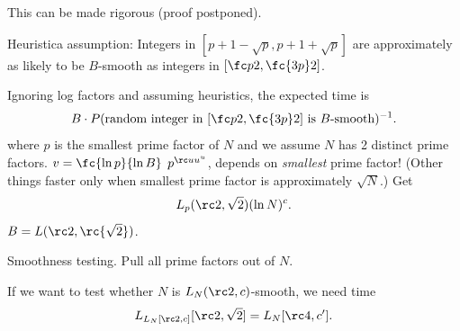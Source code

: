 This can be made rigorous (proof postponed).

Heuristica assumption: Integers in $[p+1-\sqrt p,p+1+\sqrt p]$ are approximately as likely to be $B$-smooth as integers in $[\fc p2,\fc{3p}2]$. 

Ignoring log factors and assuming heuristics, the expected time is
\[
B\cdot P(\text{random integer in }[\fc p2,\fc{3p}2]\text{ is $B$-smooth})^{-1}.
\]
where $p$ is the smallest prime factor of $N$ and we assume $N$ has 2 distinct prime factors. %
$v=\fc{\ln p}{\ln B}$ $p^{\rc uu^u}$, depends on {\it smallest} prime factor! (Other things faster only when smallest prime factor is approximately $\sqrt N$.)
Get
\[
L_p(\rc 2,\sqrt 2)(\ln N)^c.
\]
$B=L(\rc 2,\rc{\sqrt 2})$.

Smoothness testing. Pull all prime factors out of $N$.

If we want to test whether $N$ is $L_N(\rc 2,c)$-smooth, we need time
\[
L_{L_N[\rc 2,c]}[\rc 2,\sqrt 2] =L_N[\rc 4,c'].
\]
